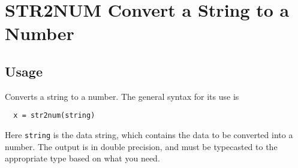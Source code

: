 \section{STR2NUM Convert a String to a Number}

\subsection{Usage}

Converts a string to a number.  The general syntax for its use
is
\begin{verbatim}
  x = str2num(string)
\end{verbatim}
Here \verb|string| is the data string, which contains the data to 
be converted into a number.  The output is in double precision,
and must be typecasted to the appropriate type based on what
you need.
